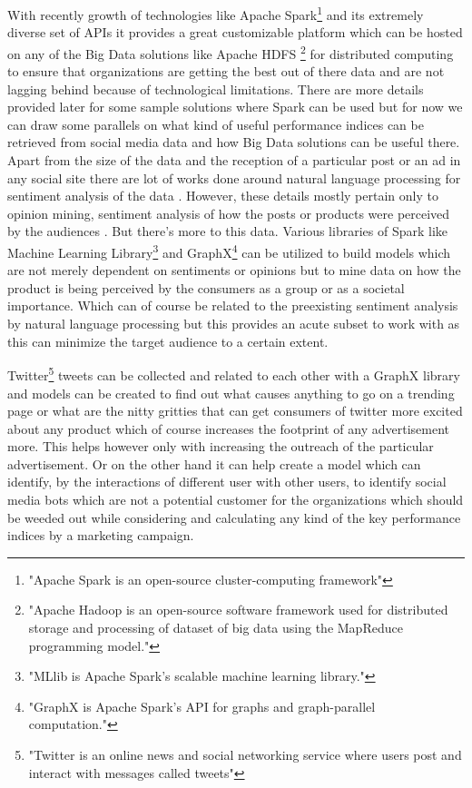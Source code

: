 \documentclass[sigconf]{acmart}
\begin{document}
With recently growth of technologies like Apache Spark\footnote{"Apache Spark is an open-source cluster-computing framework"} and its extremely diverse set of APIs it provides a great customizable platform which can be hosted on any of the Big Data solutions like Apache HDFS \footnote{"Apache Hadoop is an open-source software framework used for distributed storage and processing of dataset of big data using the MapReduce programming model."} for distributed computing to ensure that organizations are getting the best out of there data and are not lagging behind because of technological limitations. There are more details provided later for some sample solutions where Spark can be used but for now we can draw some parallels on what kind of useful performance indices can be retrieved from social media data and how Big Data solutions can be useful there. Apart from the size of the data and the reception of a particular post or an ad in any social site there are lot of works done around natural language processing for sentiment analysis of the data \cite{IJIRSTV1I11036}. However, these details mostly pertain only to opinion mining, sentiment analysis of how the posts or products were perceived by the audiences \cite{Batrinca2015}. But there's more to this data. Various libraries of Spark like Machine Learning Library\footnote{"MLlib is Apache Spark's scalable machine learning library."} and GraphX\footnote{"GraphX is Apache Spark's API for graphs and graph-parallel computation."} can be utilized to build models which are not merely dependent on sentiments or opinions but to mine data on how the product is being perceived by the consumers as a group or as a societal importance. Which can of course be related to the preexisting sentiment analysis by natural language processing but this provides an acute subset to work with as this can minimize the target audience to a certain extent.

Twitter\footnote{"Twitter is an online news and social networking service where users post and interact with messages called tweets"} tweets can be collected and related to each other with a GraphX library and models can be created to find out what causes anything to go on a trending page or what are the nitty gritties that can get consumers of twitter more excited about any product which of course increases the footprint of any advertisement more. This helps however only with increasing the outreach of the particular advertisement. Or on the other hand it can help create a model which can identify, by the interactions of different user with other users, to identify social media bots which are not a potential customer for the organizations which should be weeded out while considering and calculating any kind of the key performance indices by a marketing campaign.
\end{document}
